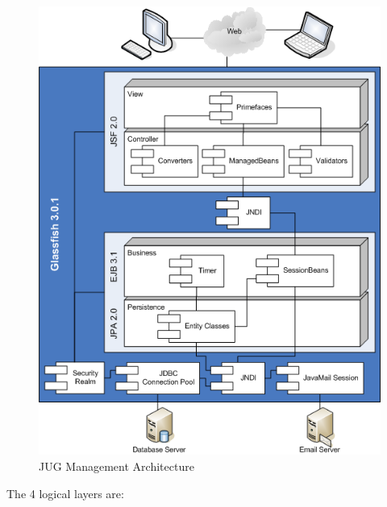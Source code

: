 \documentclass[10pt,a4paper]{report}
\begin{document}
\begin{figure}
\center
\includegraphics{images/jug_management_architecture}
\caption{JUG Management Architecture}
\label{fig:jug-management-architecture}
\end{figure}

The 4 logical layers are:
\end{document}
